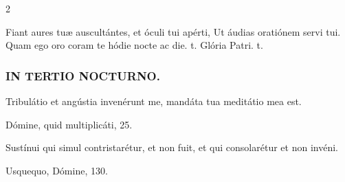 \documentclass[9pt,twoside]{extarticle}
\begin{document}
\begin{multicols}{2}
\begin{tightlist}{}
\item {} Fiant aures tuæ auscultántes, et óculi tui apérti, \textred{*} Ut áudias oratiónem servi tui.  Quam ego oro coram te hódie nocte ac die. t. Glória Patri. t.
\end{tightlist}

\subsubsection*{\center \textsc{IN TERTIO NOCTURNO.}}
\begin{tightlist}{}
\item {} Tribulátio et angústia invenérunt me, mandáta tua meditátio mea est.
\item {} Dómine, quid multiplicáti, 25.
\end{tightlist}

%
%
%
%
%
%
%
%
%

\begin{tightlist}{}
\item {} Sustínui qui simul contristarétur, et non fuit, et qui consolarétur et non invéni.
\item {} Usquequo, Dómine, 130.
\end{tightlist}


\end{multicols}
\end{document}
